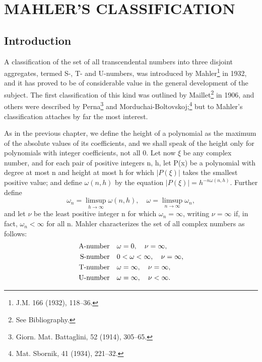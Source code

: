 
\chapter{MAHLER'S CLASSIFICATION}\label{ch:8}

\section{Introduction}\label{sec:ch8_1}

A classification of the set of all transcendental numbers into three disjoint aggregates, termed S-, T- and U-numbers, was introduced by Mahler\footnote{J.M. 166 (1932), 118--36.} in 1932, and it has proved to be of considerable value in the general development of the subject. The first classification of this kind was outlined by Maillet\footnote{See Bibliography.} in 1906, and others were described by Perna\footnote{Giorn. Mat. Battaglini, 52 (1914), 305--65.} and Morduchai-Boltovskoj;\footnote{Mat. Sbornik, 41 (1934), 221--32.} but to Mahler's classification attaches by far the most interest.

As in the previous chapter, we define the height of a polynomial as the maximum of the absolute values of its coefficients, and we shall speak of the height only for polynomials with integer coefficients, not all 0. Let now  $\xi$  be any complex number, and for each pair of positive integers n, h, let P(x) be a polynomial with degree at most n and height at most h for which  $|P(\xi)|$  takes the smallest positive value; and define  $\omega(n,h)$  by the equation  $|P(\xi)| = h^{-n\omega(n,h)}$. Further define
\[\omega_n = \limsup_{h \to \infty} \omega(n, h), \quad \omega = \limsup_{n \to \infty} \omega_n,\]
and let  $\nu$  be the least positive integer n for which  $\omega_n = \infty$, writing  $\nu = \infty$  if, in fact,  $\omega_n < \infty$  for all n. Mahler characterizes the set of all complex numbers as follows:
\begin{align*}
\text{A-number\index{A-number}} & \quad \omega = 0, \quad \nu = \infty, \\
\text{S-number\index{S*-number}\index{S-number}} & \quad 0 < \omega < \infty, \quad \nu = \infty, \\
\text{T-number\index{T-number}} & \quad \omega = \infty, \quad \nu = \infty, \\
\text{U-number\index{U-number}\index{U*-number}} & \quad \omega = \infty, \quad \nu < \infty.
\end{align*}

